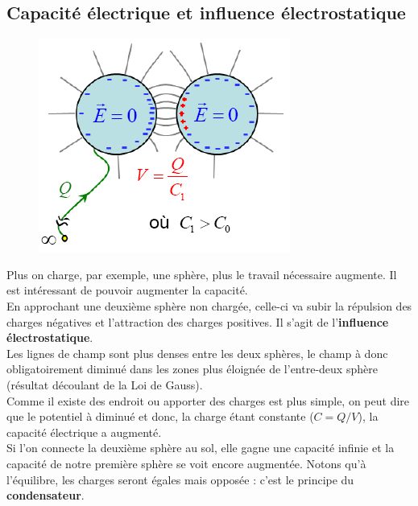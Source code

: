 \documentclass	[11pt, a4paper, openany]{book}
\begin{document}
\subsection{Capacité électrique et influence électrostatique}
\begin{figure}
	\includegraphics[scale=0.44]{es/image13.png}
\end{figure}
Plus on charge, par exemple, une sphère, plus le travail nécessaire augmente. Il est intéressant de pouvoir augmenter la capacité.\\
En approchant une deuxième sphère non chargée, celle-ci va subir la répulsion des charges négatives et l'attraction des charges positives. Il s'agit de l'\textbf{influence électrostatique}.\\
Les lignes de champ sont plus denses entre les deux sphères, le champ à donc obligatoirement diminué dans les zones plus éloignée de l'entre-deux sphère (résultat découlant de la Loi de Gauss).\\
Comme il existe des endroit ou apporter des charges est plus simple, on peut dire que le potentiel à diminué et donc, la charge étant constante ($C = Q/V$), la capacité électrique a augmenté.\\ Si l'on connecte la deuxième sphère au sol, elle gagne une capacité infinie et la capacité de notre première sphère se voit encore augmentée. Notons qu'à l'équilibre, les charges seront égales mais opposée : c'est le principe du \textbf{condensateur}.
\end{document}

